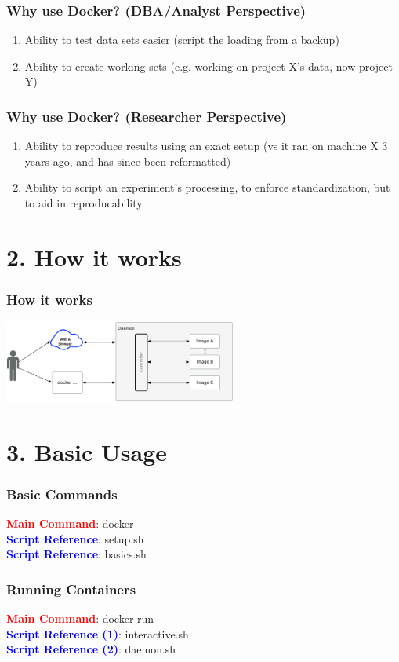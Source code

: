 \documentclass{beamer}
\begin{document}
\begin{frame}
    \frametitle{Why use Docker? (DBA/Analyst Perspective)}
    \begin{enumerate}
        \item Ability to test data sets easier (script the loading from a backup)
        \item Ability to create working sets (e.g. working on project X's data, now project Y)
    \end{enumerate}
\end{frame}

\begin{frame}
    \frametitle{Why use Docker? (Researcher Perspective)}
    \begin{enumerate}
        \item Ability to reproduce results using an exact setup (vs it ran on machine X 3 years ago, and has since been reformatted)
        \item Ability to script an experiment's processing, to enforce standardization, but to aid in reproducability
    \end{enumerate}
\end{frame}

\section{2. How it works}
\begin{frame}
    \frametitle{How it works}
    \includegraphics[width=290px]{images/HowItWorks.png}
\end{frame}

\section{3. Basic Usage}
\begin{frame}
    \frametitle{Basic Commands}
    \textcolor{red}{\textbf{Main Command}}: docker \\
    \textcolor{blue}{\textbf{Script Reference}}: setup.sh \\
    \textcolor{blue}{\textbf{Script Reference}}: basics.sh
\end{frame}

\begin{frame}
    \frametitle{Running Containers}
    \textcolor{red}{\textbf{Main Command}}: docker run \\
    \textcolor{blue}{\textbf{Script Reference (1)}}: interactive.sh \\
    \textcolor{blue}{\textbf{Script Reference (2)}}: daemon.sh
\end{frame}
\end{document}
